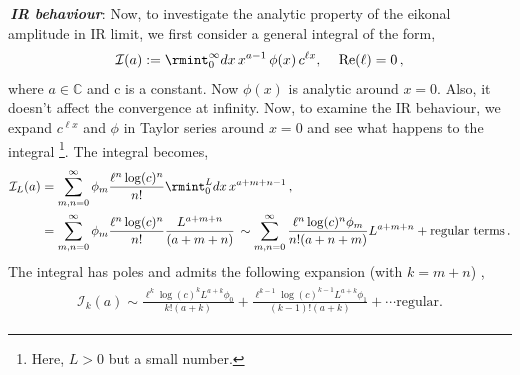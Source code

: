 {\textit{\textbf{\,{IR behaviour}}}}: 
Now, to investigate the analytic property of the eikonal amplitude in IR limit, we first consider a general integral of the form,
\begin{align}
    \begin{split}
        \mathcal{I}(a):=\rmint_0^\infty dx\, x^{a-1}\,\phi(x)\, c^{\ell x},\,\quad \textrm{Re}(\ell)=0 \,,
    \end{split}
\end{align}
 where $a\in \mathbb{C}$ and c is a constant. Now $\phi(x)$ is analytic around $x=0$. Also, it doesn't affect the convergence at infinity. Now, to examine the IR behaviour, 
we expand $c^{\ell x}$ and $\phi$ in Taylor series around $x=0$ and see what happens to the integral \footnote{Here, $L>0$ but a small number.}. The integral becomes, 
\begin{align}
    \begin{split}
\mathcal{I}_L(a)&=\sum_{m,n=0}^\infty\phi_m\frac{\ell^n \log(c)^n}{n!}\rmint_0^L dx \,x^{a+m+n-1}\,,\\&
=\sum_{m,n=0}^\infty\phi_m\frac{\ell^n \log(c)^n}{n!}\frac{L^{a+m+n}}{(a+m+n)}
\,\sim\sum_{m,n=0}^\infty\frac{\ell^n \log(c)^n\phi_m}{n!(a+n+m)}L^{a+m+n}+\text{regular terms}\,.
    \end{split}
\end{align}
The integral has poles and admits the following expansion (with $k=m+n$) ,
\begin{align}
\begin{split}
   \mathcal{I}_k(a)\sim\frac{\ell^k \log(c)^kL^{a+k}{\phi_0}}{k!(a+k)}+\frac{\ell^{k-1} \log(c)^{k-1}L^{a+k}{\phi_1}}{(k-1)!(a+k)}+\cdots\text{regular}.\label{3.34p}
\end{split}
\end{align}

